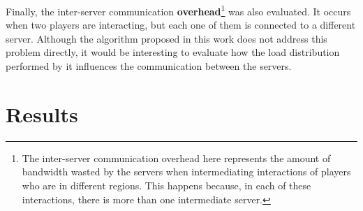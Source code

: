 \documentclass[acmjacm]{acmtrans2m}
\begin{document}
Finally, the inter-server communication \textbf{overhead}\footnote{The inter-server communication overhead here represents the amount of bandwidth wasted by the servers when intermediating interactions of players who are in different regions. This happens because, in each of these interactions, there is more than one intermediate server.} %
was also evaluated. It occurs when two players are interacting, but each one of them is connected to a different server. Although the algorithm proposed in this work does not address this problem directly, it would be interesting to evaluate how the load distribution performed by it influences the communication between the servers.

\section{Results}
\label{sec:result}
\end{document}
